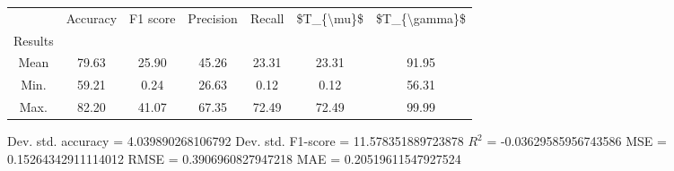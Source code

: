 \begin{tabular}{|c|c|c|c|c|c|c|}
\toprule
{} &  Accuracy &  F1 score &  Precision &  Recall &  \$T\_\{\textbackslash mu\}\$ &  \$T\_\{\textbackslash gamma\}\$ \\
Results &           &           &            &         &            &               \\
\hline
Mean    &     79.63 &     25.90 &      45.26 &   23.31 &      23.31 &         91.95 \\
Min.    &     59.21 &      0.24 &      26.63 &    0.12 &       0.12 &         56.31 \\
Max.    &     82.20 &     41.07 &      67.35 &   72.49 &      72.49 &         99.99 \\
\bottomrule
\end{tabular}

 Dev. std. accuracy = 4.039890268106792
 Dev. std. F1-score = 11.578351889723878
 $R^2$ = -0.03629585956743586
 MSE = 0.15264342911114012
 RMSE = 0.3906960827947218
 MAE = 0.20519611547927524